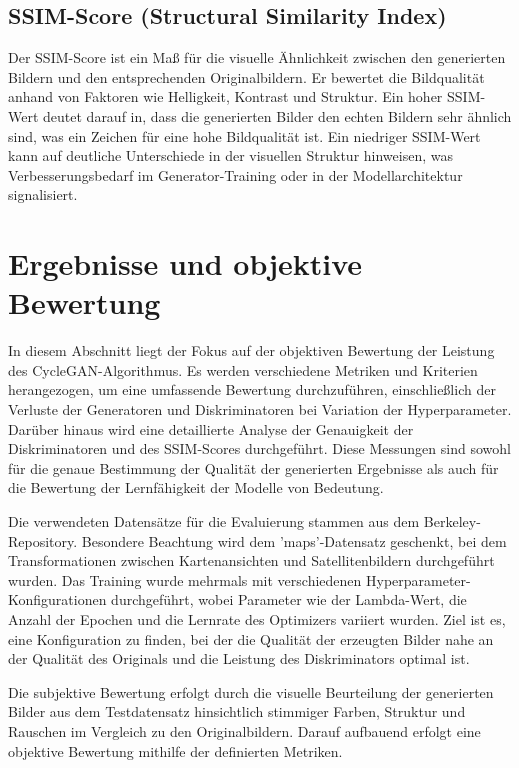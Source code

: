 \subsection{SSIM-Score (Structural Similarity Index)}
Der SSIM-Score ist ein Maß für die visuelle Ähnlichkeit zwischen den generierten Bildern und den entsprechenden Originalbildern. Er bewertet die Bildqualität anhand von Faktoren wie Helligkeit, Kontrast und Struktur. Ein hoher SSIM-Wert deutet darauf in, dass die generierten Bilder den echten Bildern sehr ähnlich sind, was ein Zeichen für eine hohe Bildqualität ist. Ein niedriger SSIM-Wert kann auf deutliche Unterschiede in der visuellen Struktur hinweisen, was Verbesserungsbedarf im Generator-Training oder in der Modellarchitektur signalisiert.

\section{Ergebnisse und objektive Bewertung}
In diesem Abschnitt liegt der Fokus auf der objektiven Bewertung der Leistung des CycleGAN-Algorithmus. Es werden verschiedene Metriken und Kriterien herangezogen, um eine umfassende Bewertung durchzuführen, einschließlich der Verluste der Generatoren und Diskriminatoren bei Variation der Hyperparameter. Darüber hinaus wird eine detaillierte Analyse der Genauigkeit der Diskriminatoren und des SSIM-Scores durchgeführt. Diese Messungen sind sowohl für die genaue Bestimmung der Qualität der generierten Ergebnisse als auch für die Bewertung der Lernfähigkeit der Modelle von Bedeutung.

Die verwendeten Datensätze für die Evaluierung stammen aus dem Berkeley-Repository. Besondere Beachtung wird dem 'maps'-Datensatz geschenkt, bei dem Transformationen zwischen Kartenansichten und Satellitenbildern durchgeführt wurden. Das Training wurde mehrmals mit verschiedenen Hyperparameter-\\Konfigurationen durchgeführt, wobei Parameter wie der Lambda-Wert, die Anzahl der Epochen und die Lernrate des Optimizers variiert wurden. Ziel ist es, eine Konfiguration zu finden, bei der die Qualität der erzeugten Bilder nahe an der Qualität des Originals und die Leistung des Diskriminators optimal ist.

Die subjektive Bewertung erfolgt durch die visuelle Beurteilung der generierten Bilder aus dem Testdatensatz hinsichtlich stimmiger Farben, Struktur und Rauschen im Vergleich zu den Originalbildern. Darauf aufbauend erfolgt eine objektive Bewertung mithilfe der definierten Metriken.


